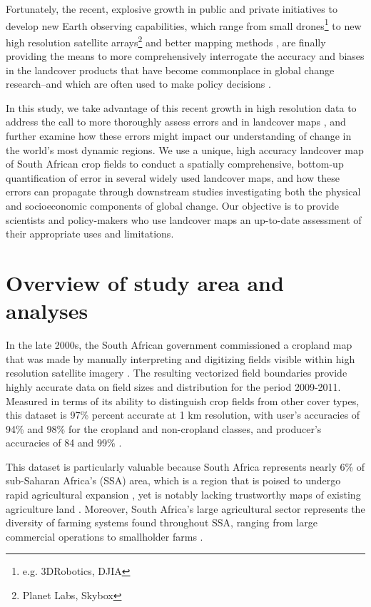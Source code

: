\documentclass{pnastwo2}
\begin{document}
\begin{article}
Fortunately, the recent, explosive growth in public and private initiatives to develop new Earth observing capabilities, which range from small drones\footnote{e.g. 3DRobotics, DJIA} to new high resolution satellite arrays\footnote{Planet Labs, Skybox} and better mapping methods \cite{fritz_geo-wiki:_2012,tuanmu_global_2014,estes_projected_2013, debats_generalized_2015}, are finally providing the means to more comprehensively interrogate the accuracy and biases in the landcover products that have become commonplace in global change research--and which are often used to make policy decisions \cite{searchinger_high_2015}.  

In this study, we take advantage of this recent growth in high resolution data to address the call to more thoroughly assess errors and in landcover maps \cite{kuemmerle_challenges_2013, olofsson_good_2014,olofsson_global_2012}, and further examine how these errors might impact our understanding of change in the world's most dynamic regions.  We use a unique, high accuracy landcover map of South African crop fields to conduct a spatially comprehensive, bottom-up quantification of error in several widely used landcover maps, and how these errors can propagate through downstream studies investigating both the physical and socioeconomic components of global change. Our objective is to provide scientists and policy-makers who use landcover maps an up-to-date assessment of their appropriate uses and limitations. 

\vspace{-0.5 cm}
\section{Overview of study area and analyses}
In the late 2000s, the South African government commissioned a cropland map that was made by manually interpreting and digitizing fields visible within high resolution satellite imagery \cite{fourie_better_2009}. The resulting vectorized field boundaries provide highly accurate data on field sizes and distribution for the period 2009-2011. Measured in terms of its ability to distinguish crop fields from other cover types, this dataset is 97\% percent accurate at 1 km resolution, with user's accuracies of 94\% and 98\% for the cropland and non-cropland classes, and producer's accuracies of 84 and 99\%  \cite[][SI]{estes_platform_2015}.

This dataset is particularly valuable because South Africa represents nearly 6\% of sub-Saharan Africa's (SSA) area, which is a region that is poised to undergo rapid agricultural expansion \cite{searchinger_high_2015}, yet is notably lacking trustworthy maps of existing agriculture land \cite{fritz_comparison_2010}. Moreover, South Africa's large agricultural sector represents the diversity of farming systems found throughout SSA, ranging from large commercial operations to smallholder farms \cite{hardy_rainfed_2011,estes_using_2014}.


\end{article}
\end{document}
